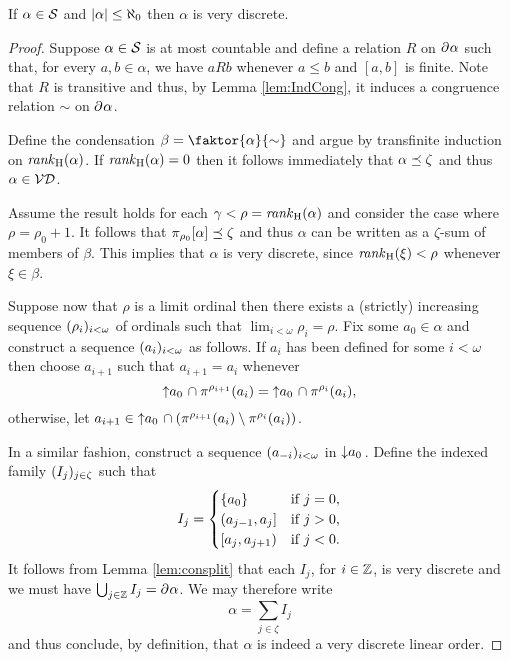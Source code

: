 \begin{lem}\label{prp:sctvd}
	If $\alpha\in\mathcal{S}$ and $\left\lvert\alpha\right\rvert\leq\aleph_0$ then $\alpha$ is
	very discrete.
\end{lem}
\begin{proof}
	Suppose $\alpha\in\mathcal{S}$ is at most countable and define a relation $R$
	on $\partial^{}{}\alpha$ such that, for every $a,b\in\alpha$, we have $aRb$
	whenever $a\leq b$ and $[a,b]$ is finite.  Note that $R$ is transitive and
	thus, by Lemma \ref{lem:IndCong}, it induces a congruence relation $\sim$ on
	$\partial^{}{}\alpha$.

	Define the condensation $\beta=\faktor{\alpha}{\sim}$ and argue by
	transfinite induction on $\mathit{rank}_\mathrm{H}(\alpha)$.  If $\mathit{rank}_\mathrm{H}(\alpha)=0$ then it
	follows immediately that $\alpha\preceq\zeta$ and thus $\alpha\in\mathcal{VD}$.

	Assume the result holds for each $\gamma<\rho=\mathit{rank}_\mathrm{H}(\alpha)$ and consider
	the case where $\rho=\rho_0+1$.  It follows that
	$\pi_{\rho_0}[\alpha]\preceq\zeta$ and thus $\alpha$ can be written as a
	$\zeta$-sum of members of $\beta$.  This implies that $\alpha$ is very
	discrete, since $\mathit{rank}_\mathrm{H}(\xi)<\rho$ whenever $\xi\in\beta$.

	Suppose now that $\rho$ is a limit ordinal then there exists a (strictly)
	increasing sequence
	$(\rho_i)_{i<\omega}$ of ordinals such that
	$\lim_{i<\omega}\rho_i=\rho$.  Fix some $a_0\in\alpha$ and construct a
	sequence $(a_i)_{i<\omega}$ as follows.  If $a_i$ has been defined for
	some $i<\omega$ then choose $a_{i+1}$ such that $a_{i+1}=a_i$ whenever
	\begin{equation}
		\left\uparrow a_0\right.\cap\pi^{\rho_{i+1}}(a_i)=\left\uparrow a_0\right.\cap\pi^{\rho_i}(a_i),
	\end{equation}
	otherwise, let
	$a_{i+1}\in\left\uparrow a_0\right.\cap(\pi^{\rho_{i+1}}(a_i)\setminus\pi^{\rho_i}(a_i))$.

	In a similar fashion, construct a sequence $(a_{-i})_{i<\omega}$ in
	$\left\downarrow a_0\right.$.  Define the indexed family $(I_j)_{j\in\zeta}$
	such that
	\begin{equation}
		I_j=\begin{cases}
			\left\lbrace a_0\right\rbrace&\text{if }j=0,\\
			(a_{j-1},a_j]&\text{if }j>0,\\
			[a_j,a_{j+1})&\text{if }j<0.
		\end{cases}
	\end{equation}
	It follows from Lemma \ref{lem:consplit} that each $I_j$, for $i\in\mathbb{Z}$,
	is very discrete and we must have $\bigcup_{j\in\mathbb{Z}} I_j=\partial^{}{}\alpha$.
	We may therefore write
	\begin{equation}
		\alpha=\sum_{j\in\zeta}I_j
	\end{equation}
	and thus conclude, by definition, that $\alpha$ is indeed a very discrete
	linear order.
\end{proof}

